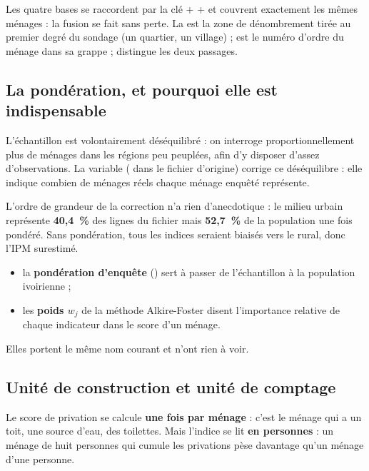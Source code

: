 \documentclass[11pt,a4paper]{article}
\begin{document}
Les quatre bases se raccordent par la clé  +  +  et couvrent
exactement les mêmes ménages : la fusion se fait sans perte. La  est la zone de
dénombrement tirée au premier degré du sondage (un quartier, un village) ;  est le
numéro d'ordre du ménage dans sa grappe ;  distingue les deux passages.

\subsection{La pondération, et pourquoi elle est indispensable}

L'échantillon est volontairement déséquilibré : on interroge proportionnellement plus de ménages
dans les régions peu peuplées, afin d'y disposer d'assez d'observations. La variable
 ( dans le fichier d'origine) corrige ce déséquilibre : elle
indique combien de ménages réels chaque ménage enquêté représente.

L'ordre de grandeur de la correction n'a rien d'anecdotique : le milieu urbain représente
\textbf{40,4~\%} des lignes du fichier mais \textbf{52,7~\%} de la population une fois pondéré.
Sans pondération, tous les indices seraient biaisés vers le rural, donc l'IPM surestimé.

\begin{retenir}
\begin{itemize}
  \item la \textbf{pondération d'enquête} () sert à passer de
        l'échantillon à la population ivoirienne ;
  \item les \textbf{poids $w_j$} de la méthode Alkire-Foster disent l'importance relative de
        chaque indicateur dans le score d'un ménage.
\end{itemize}
Elles portent le même nom courant et n'ont rien à voir.
\end{retenir}

\subsection{Unité de construction et unité de comptage}

Le score de privation se calcule \textbf{une fois par ménage} : c'est le ménage qui a un toit, une
source d'eau, des toilettes. Mais l'indice se lit \textbf{en personnes} : un ménage de huit
personnes qui cumule les privations pèse davantage qu'un ménage d'une personne.
\end{document}

